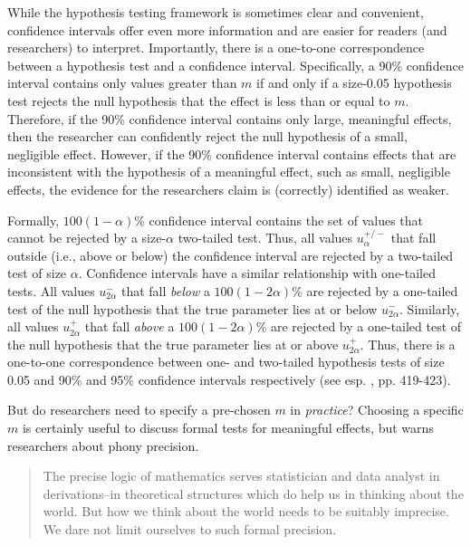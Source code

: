 \documentclass[12pt]{article}
\begin{document}
While the hypothesis testing framework is sometimes clear and convenient, confidence intervals offer even more information and are easier for readers (and researchers) to interpret. Importantly, there is a one-to-one correspondence between a hypothesis test and a confidence interval. Specifically, a 90\% confidence interval contains only values greater than $m$ if and only if a size-0.05 hypothesis test rejects the null hypothesis that the effect is less than or equal to $m$. Therefore, if the 90\% confidence interval contains only large, meaningful effects, then the researcher can confidently reject the null hypothesis of a small, negligible effect. However, if the 90\% confidence interval contains effects that are inconsistent with the hypothesis of a meaningful effect, such as small, negligible effects, the evidence for the researchers claim is (correctly) identified as weaker. 

Formally, $100(1-\alpha)$\% confidence interval contains the set of values that cannot be rejected by a size-$\alpha$ two-tailed test. Thus, all values $u^{+/-}_{\alpha}$ that fall outside (i.e., above or below) the confidence interval are rejected by a two-tailed test of size $\alpha$. Confidence intervals have a similar relationship with one-tailed tests. All values $u^{-}_{2\alpha}$ that fall \textit{below} a $100(1-2\alpha)$\% are rejected by a one-tailed test of the null hypothesis that the true parameter lies at or below $u^{-}_{2\alpha}$. Similarly, all values $u^{+}_{2\alpha}$ that fall \textit{above} a $100(1-2\alpha)$\% are rejected by a one-tailed test of the null hypothesis that the true parameter lies at or above $u^{+}_{2\alpha}$. Thus, there is a one-to-one correspondence between one- and two-tailed hypothesis tests of size 0.05 and 90\% and 95\% confidence intervals respectively (see esp. \citealt{CasellaBerger2002}, pp. 419-423).

But do researchers need to specify a pre-chosen $m$ in \emph{practice}? Choosing a specific $m$ is certainly useful to discuss formal tests for meaningful effects, but \citet[pp. 101-102]{Tukey1991} warns researchers about phony precision.

\begin{quote}
The precise logic of mathematics serves statistician and data analyst in derivations--in theoretical structures which do help us in thinking about the world. But how we think about the world needs to be suitably imprecise. We dare not limit ourselves to such formal precision.
\end{quote}
\end{document}
